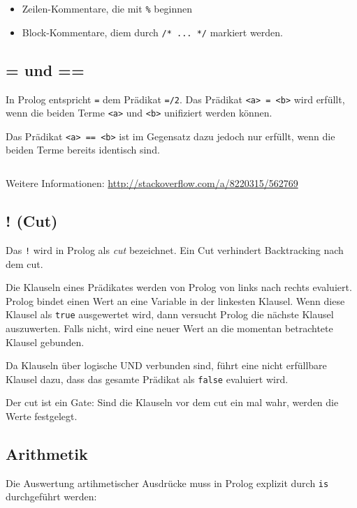 \begin{itemize}
    \item Zeilen-Kommentare, die mit \verb+%+ beginnen
    \item Block-Kommentare, diem durch \verb+/* ... */+ markiert werden.
\end{itemize}

\subsection{= und ==}
In Prolog entspricht \texttt{=} dem Prädikat \texttt{=/2}. Das Prädikat \texttt{<a> = <b>} wird
erfüllt, wenn die beiden Terme \texttt{<a>} und \texttt{<b>} unifiziert werden
können.

Das Prädikat \texttt{<a> == <b>} ist im Gegensatz dazu jedoch nur erfüllt, wenn
die beiden Terme bereits identisch sind.

\begin{beispiel}[= und ==]
    \inputminted[numbersep=5pt, tabsize=4]{prolog}{scripts/prolog/equal.pl}
\end{beispiel}

Weitere Informationen: \url{http://stackoverflow.com/a/8220315/562769}

\subsection{! (Cut)}
Das \texttt{!} wird in Prolog als \textit{cut} bezeichnet. Ein Cut verhindert
Backtracking nach dem cut.

Die Klauseln eines Prädikates werden von Prolog von links nach rechts evaluiert.
Prolog bindet einen Wert an eine Variable in der linkesten Klausel. Wenn diese
Klausel als \texttt{true} ausgewertet wird, dann versucht Prolog die nächste
Klausel auszuwerten. Falls nicht, wird eine neuer Wert an die momentan
betrachtete Klausel gebunden.

Da Klauseln über logische UND verbunden sind, führt eine nicht erfüllbare
Klausel dazu, dass das gesamte Prädikat als \texttt{false} evaluiert wird.

Der cut ist ein Gate: Sind die Klauseln vor dem cut ein mal wahr, werden die
Werte festgelegt.

\subsection{Arithmetik}
Die Auswertung artihmetischer Ausdrücke muss in Prolog explizit durch \texttt{is}
durchgeführt werden:

